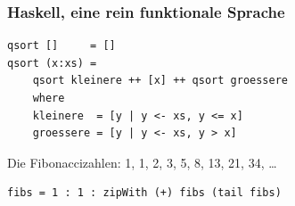 \documentclass[12pt,compress,ngerman,utf8,t]{beamer}
\begin{document}
\begin{frame}[fragile]\frametitle{Haskell, eine rein funktionale Sprache}
  \large\vspace{-0.5em}
  \begin{verbatim}
qsort []     = []
qsort (x:xs) =
    qsort kleinere ++ [x] ++ qsort groessere
    where
    kleinere  = [y | y <- xs, y <= x]
    groessere = [y | y <- xs, y > x]
  \end{verbatim}
  \vfill


  \pause
  Die Fibonaccizahlen: 1, 1, 2, 3, 5, 8, 13, 21, 34, \ldots
  \begin{verbatim}
fibs = 1 : 1 : zipWith (+) fibs (tail fibs)
  \end{verbatim}

  \pause


\end{frame}
\end{document}
